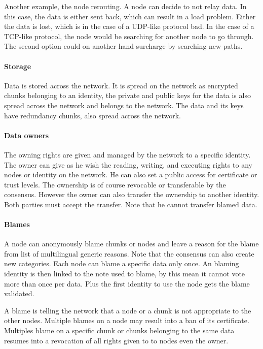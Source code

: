 Another example, the node rerouting. A node can decide to not relay data. In this case, the data is either sent back, which can result in a load problem. Either the data is lost, which is in the case of a UDP-like protocol bad. In the case of a TCP-like protocol, the node would be searching for another node to go through. The second option could on another hand surcharge by searching new paths.

\paragraph{Storage} Data is stored across the network. It is spread on the network as encrypted chunks belonging to an identity, the private and public keys for the data is also spread across the network and belongs to the network. The data and its keys have redundancy chunks, also spread across the network.

\paragraph{Data owners} The owning rights are given and managed by the network to a specific identity. The owner can give as he wish the reading, writing, and executing rights to any nodes or identity on the network. He can also set a public access for certificate or trust levels. The ownership is of course revocable or transferable by the consensus. However the owner can also transfer the ownership to another identity. Both parties must accept the transfer. Note that he cannot transfer blamed data.

\paragraph{Blames} A node can anonymously blame chunks or nodes and leave a reason for the blame from list of multilingual generic reasons. Note that the consensus can also create new categories. Each node can blame a specific data only once. An blaming identity is then linked to the note used to blame, by this mean it cannot vote more than once per data. Plus the first identity to use the node gets the blame validated.

A blame is telling the network that a node or a chunk is not appropriate to the other nodes. Multiple blames on a node may result into a ban of its certificate. Multiples blame on a specific chunk or chunks belonging to the same data resumes into a revocation of all rights given to to nodes even the owner.

